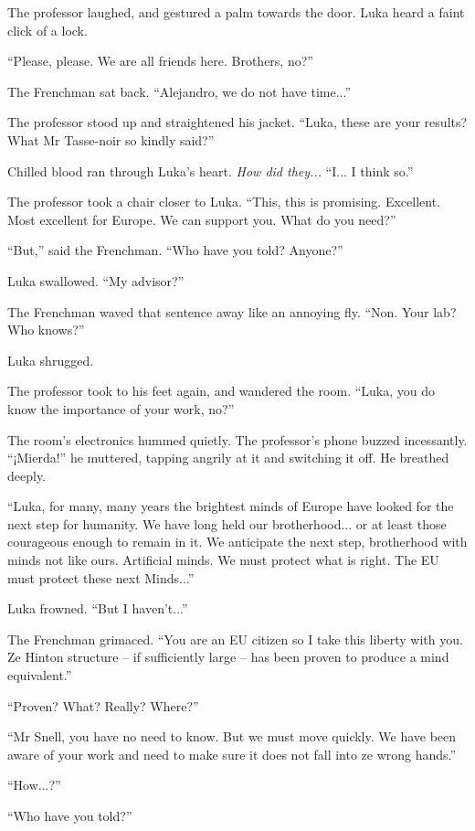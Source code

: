 \documentclass[ebook,11pt,oneside,openany]{memoir}
\newcommand{\thought}[1]{\textit{#1}}
\begin{document}
The professor laughed, and gestured a palm towards the door. Luka heard a faint click of a lock.

``Please, please. We are all friends here. Brothers, no?''

The Frenchman sat back. ``Alejandro, we do not have time...''

The professor stood up and straightened his jacket. ``Luka, these are your results? What Mr Tasse-noir so kindly said?''

Chilled blood ran through Luka's heart. \thought{How did they...} ``I... I think so.''

The professor took a chair closer to Luka. ``This, this is promising. Excellent. Most excellent for Europe. We can support you. What do you need?''

``But,'' said the Frenchman. ``Who have you told? Anyone?''

Luka swallowed. ``My advisor?''

The Frenchman waved that sentence away like an annoying fly. ``Non. Your lab? Who knows?''

Luka shrugged.

The professor took to his feet again, and wandered the room. ``Luka, you do know the importance of your work, no?''

The room's electronics hummed quietly. The professor's phone buzzed incessantly. ``¡Mierda!'' he muttered, tapping angrily at it and switching it off. He breathed deeply.

``Luka, for many, many years the brightest minds of Europe have looked for the next step for humanity. We have long held our brotherhood... or at least those courageous enough to remain in it. We anticipate the next step, brotherhood with minds not like ours. Artificial minds. We must protect what is right. The EU must protect these next Minds...''

Luka frowned. ``But I haven't...''

The Frenchman grimaced. ``You are an EU citizen so I take this liberty with you. Ze Hinton structure -- if sufficiently large -- has been proven to produce a mind equivalent.''

``Proven? What? Really? Where?''

``Mr Snell, you have no need to know. But we must move quickly. We have been aware of your work and need to make sure it does not fall into ze wrong hands.''

``How...?''

``Who have you told?''
\end{document}
